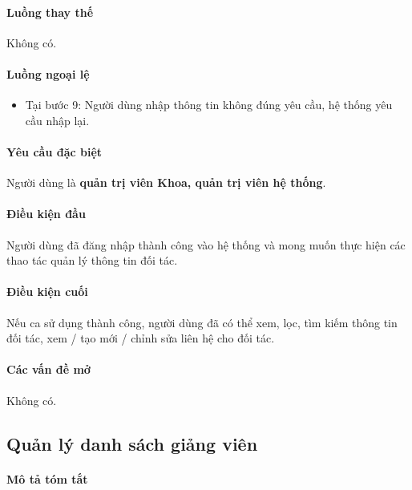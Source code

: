 \documentclass[./../main.tex]{subfiles}
\begin{document}
\paragraph*{Luồng thay thế} Không có.

\paragraph*{Luồng ngoại lệ}

\begin{itemize}
	\item

	      Tại bước 9: Người dùng nhập thông tin không đúng yêu cầu, hệ thống yêu cầu nhập lại.

\end{itemize}

\paragraph*{Yêu cầu đặc biệt}

Người dùng là \textbf{quản trị viên Khoa, quản trị viên hệ thống}.

\paragraph*{Điều kiện đầu}

Người dùng đã đăng nhập thành công vào hệ thống và mong muốn thực hiện các thao tác quản lý thông tin đối tác.

\paragraph*{Điều kiện cuối}

Nếu ca sử dụng thành công, người dùng đã có thể xem, lọc, tìm kiếm thông tin đối tác, xem / tạo mới / chỉnh sửa liên hệ cho đối tác.

\paragraph*{Các vấn đề mở}

Không có.

\subsection{Quản lý danh sách giảng viên}

\paragraph*{Mô tả tóm tắt}
\end{document}
